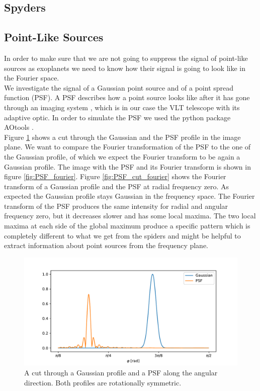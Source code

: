 \subsection{Spyders}

\subsection{Point-Like Sources}
In order to make sure that we are not going to suppress the signal of point-like sources as exoplanets we need to know how their signal is going to look like in the Fourier space.\\
We investigate the signal of a Gaussian point source and of a point spread function (PSF). A PSF describes how a point source looks like after it has gone through an imaging system \cite{PSFwiki}, which is in our case the VLT telescope with its adaptive optic. In order to simulate the PSF we used the python package AOtools \cite{AOtools}.\\
Figure \ref{fig:PSF_cut_image} shows a cut through the Gaussian and the PSF profile in the image plane. We want to compare the Fourier transformation of the PSF to the one of the Gaussian profile, of which we expect the Fourier transform to be again a Gaussian profile. The image with the PSF and its Fourier transform is shown in figure \ref{fig:PSF_fourier}. Figure \ref{fig:PSF_cut_fourier} shows the Fourier transform of a Gaussian profile and the PSF at radial frequency zero. As expected the Gaussian profile stays Gaussian in the frequency space. The Fourier transform of the PSF produces the same intensity for radial and angular frequency zero, but it decreases slower and has some local maxima. The two local maxima at each side of the global maximum produce a specific pattern which is completely different to what we get from the spiders and might be helpful to extract information about point sources from the frequency plane.  
\begin{figure}[H]
	\centering
		\includegraphics[width=1.0\textwidth]{pics/PSF_cut_image.pdf}
		\caption{A cut through a Gaussian profile and a PSF along the angular direction. Both profiles are rotationally symmetric.}
		\label{fig:PSF_cut_image}
\end{figure}
